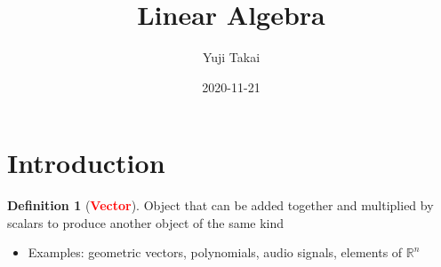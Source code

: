 \documentclass[12pt]{article}
\title{Linear Algebra}
\date{2020-11-21}
\author{Yuji Takai}
\theoremstyle{definition}
\newtheorem{definition}{Definition}[section]
\newcommand{\keyword}[1]{\textbf{\textcolor{red}{#1}}}
\begin{document}
    \maketitle
    \newpage
    \section{Introduction}
        \begin{definition}[\keyword{Vector}]
            Object that can be added together and 
                multiplied by scalars to produce another object of the same kind
        \end{definition}
        \begin{itemize}
            \item Examples: geometric vectors, polynomials, audio 
                signals, elements of $\mathbb{R}^n$
        \end{itemize}
\end{document}
